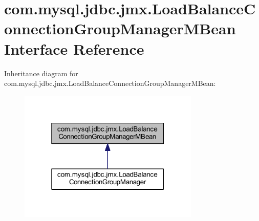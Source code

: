 \hypertarget{interfacecom_1_1mysql_1_1jdbc_1_1jmx_1_1_load_balance_connection_group_manager_m_bean}{}\section{com.\+mysql.\+jdbc.\+jmx.\+Load\+Balance\+Connection\+Group\+Manager\+M\+Bean Interface Reference}
\label{interfacecom_1_1mysql_1_1jdbc_1_1jmx_1_1_load_balance_connection_group_manager_m_bean}


Inheritance diagram for com.\+mysql.\+jdbc.\+jmx.\+Load\+Balance\+Connection\+Group\+Manager\+M\+Bean\+:
\nopagebreak
\begin{figure}[H]
\begin{center}
\leavevmode
\includegraphics[width=244pt]{interfacecom_1_1mysql_1_1jdbc_1_1jmx_1_1_load_balance_connection_group_manager_m_bean__inherit__graph}
\end{center}
\end{figure}

